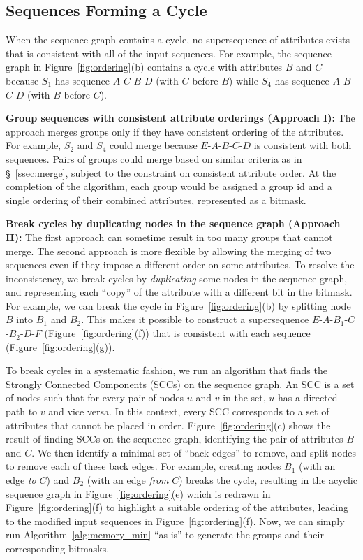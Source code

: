 \subsection{Sequences Forming a Cycle}
\label{ss:breakcycle}
When the sequence graph contains a cycle, no supersequence of attributes exists that is consistent with all of the input sequences.  For example, the sequence graph in Figure~\ref{fig:ordering}(b) contains a cycle with attributes $B$ and $C$ because $S_1$ has sequence $A$-$C$-$B$-$D$ (with $C$ before $B$) while $S_4$ has sequence $A$-$B$-$C$-$D$ (with $B$ before $C$).

\textbf{Group sequences with consistent attribute orderings (Approach I):} The approach merges groups only if they have consistent ordering of the attributes.  For example, $S_2$ and $S_4$ could merge because $E$-$A$-$B$-$C$-$D$ is consistent with both sequences.  Pairs of groups could merge based on similar
criteria as in \S~\ref{ssec:merge}, subject to the constraint on consistent attribute order.  At the completion
of the algorithm, each group would be assigned a group id and a single ordering of their combined attributes, represented as a bitmask.

\textbf{Break cycles by duplicating nodes in the sequence graph (Approach II):} The first approach can sometime result in too many groups that cannot merge. The second approach is more flexible by allowing the merging of two sequences even if they impose a different order on some attributes.  To resolve the inconsistency, we break cycles by \emph{duplicating} some nodes in the sequence graph, and representing each ``copy'' of the attribute with a different bit in the bitmask.  For example, we can break the cycle in Figure~\ref{fig:ordering}(b) by splitting node $B$ into $B_1$ and $B_2$.  This makes it possible to construct a supersequence $E$-$A$-$B_1$-$C$-$B_2$-$D$-$F$ (Figure~\ref{fig:ordering}(f)) that is consistent with each sequence (Figure~\ref{fig:ordering}(g)).

To break cycles in a systematic fashion, we run an algorithm that finds the Strongly Connected Components (SCCs) on the sequence graph.  An SCC is a set of nodes such that for every pair of nodes $u$ and $v$ in the set, $u$ has a directed path to $v$ and vice versa. In this context, every SCC corresponds to a set of attributes that cannot be placed in order.  Figure~\ref{fig:ordering}(c) shows the result of finding SCCs on the sequence graph, identifying the pair of attributes $B$ and $C$. We then identify a minimal set of ``back edges'' to remove, and split nodes to remove each of these back edges.  For example, creating nodes $B_1$ (with an edge \emph{to} $C$) and $B_2$ (with an edge \emph{from} $C$) breaks the cycle, resulting in the acyclic sequence graph in Figure~\ref{fig:ordering}(e) which is redrawn in Figure~\ref{fig:ordering}(f) to highlight a suitable ordering of the attributes, leading to the modified input sequences in Figure~\ref{fig:ordering}(f).  Now, we can simply run Algorithm~\ref{alg:memory_min} ``as is'' to generate the groups and their corresponding bitmasks.

